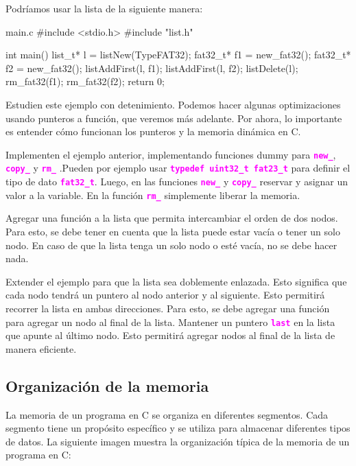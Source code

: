 \documentclass[]{scrartcl}
\newcommand{\hl}[1]{\textcolor{magenta}{\textbf{\texttt{#1}}}}
\begin{document}
Podríamos usar la lista de la siguiente manera:

\begin{cbox}[]{main.c}
  #include <stdio.h>
  #include "list.h"

  int main() {
    list_t* l = listNew(TypeFAT32);
    fat32_t* f1 = new_fat32();
    fat32_t* f2 = new_fat32();
    listAddFirst(l, f1);
    listAddFirst(l, f2);
    listDelete(l);
    rm_fat32(f1);
    rm_fat32(f2);
    return 0;
  }
\end{cbox}

Estudien este ejemplo con detenimiento. Podemos hacer algunas optimizaciones usando punteros a función, que veremos más adelante. Por ahora, lo importante es entender cómo funcionan los punteros y la memoria dinámica en C.

\begin{exbox}
  Implementen el ejemplo anterior, implementando funciones dummy para \hl{new\_}, \hl{copy\_} y \hl{rm\_} .Pueden por ejemplo usar \hl{typedef uint32\_t fat23\_t} para definir el tipo de dato \hl{fat32\_t}. Luego, en las funciones \hl{new\_} y \hl{copy\_} reservar y asignar un valor a la variable. En la función \hl{rm\_} simplemente liberar la memoria.
\end{exbox}

\begin{exbox}
  Agregar una función a la lista que permita intercambiar el orden de dos nodos. Para esto, se debe tener en cuenta que la lista puede estar vacía o tener un solo nodo. En caso de que la lista tenga un solo nodo o esté vacía, no se debe hacer nada.
\end{exbox}

\begin{exbox}
  Extender el ejemplo para que la lista sea doblemente enlazada. Esto significa que cada nodo tendrá un puntero al nodo anterior y al siguiente. Esto permitirá recorrer la lista en ambas direcciones. Para esto, se debe agregar una función para agregar un nodo al final de la lista. Mantener un puntero \hl{last} en la lista que apunte al último nodo. Esto permitirá agregar nodos al final de la lista de manera eficiente.
\end{exbox}

\subsection*{Organización de la memoria}

La memoria de un programa en C se organiza en diferentes segmentos. Cada segmento tiene un propósito específico y se utiliza para almacenar diferentes tipos de datos. La siguiente imagen muestra la organización típica de la memoria de un programa en C:
\end{document}
